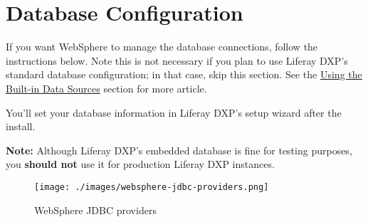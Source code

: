 \section{Database Configuration}\label{database-configuration-2}

If you want WebSphere to manage the database connections, follow the
instructions below. Note this is not necessary if you plan to use
Liferay DXP's standard database configuration; in that case, skip this
section. See the
\href{/docs/7-2/deploy/-/knowledge_base/d/preparing-for-install\#using-the-built-in-data-source}{Using
the Built-in Data Sources} section for more article.

You'll set your database information in Liferay DXP's setup wizard after
the install.

\noindent\hrulefill

\textbf{Note:} Although Liferay DXP's embedded database is fine for
testing purposes, you \textbf{should not} use it for production Liferay
DXP instances.

\noindent\hrulefill

\begin{figure}
\centering
\texttt{[image: ./images/websphere-jdbc-providers.png]}
\caption{WebSphere JDBC providers}
\end{figure}

